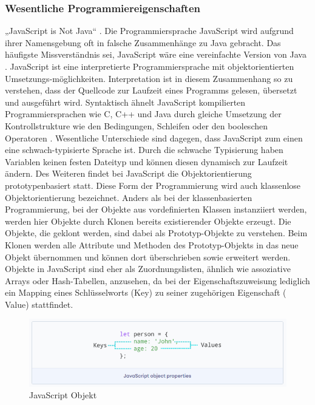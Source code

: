 \subsubsection{Wesentliche Programmiereigenschaften}
„JavaScript is Not Java“  \cite{JS1.091}. Die Programmiersprache JavaScript wird aufgrund ihrer Namensgebung oft in falsche Zusammenhänge zu Java gebracht. Das häufigste Missverständnis sei, JavaScript wäre eine vereinfachte Version von Java \cite{JS1.091}.
\newline
\noindent
JavaScript ist eine interpretierte Programmiersprache mit objektorientierten Umsetzungs-möglichkeiten. Interpretation ist in diesem Zusammenhang so zu verstehen, dass der Quellcode zur Laufzeit eines Programms gelesen, übersetzt und ausgeführt wird.
Syntaktisch ähnelt JavaScript kompilierten Programmiersprachen wie C, C++ und Java durch gleiche Umsetzung der Kontrollstrukture wie den Bedingungen, Schleifen oder den booleschen Operatoren \cite{JS1.1}. Wesentliche Unterschiede sind dagegen, dass JavaScript zum einen eine schwach-typisierte Sprache ist. Durch die schwache Typisierung haben Variablen keinen festen Dateityp und können diesen dynamisch zur Laufzeit ändern. Des Weiteren findet bei JavaScript die Objektorientierung prototypenbasiert statt. Diese Form der Programmierung wird auch klassenlose Objektorientierung bezeichnet. Anders als bei der klassenbasierten Programmierung, bei der Objekte aus vor\-de\-fi\-niert\-en Klassen instanziiert werden, werden hier Objekte durch Klonen bereits existierender Objekte erzeugt. Die Objekte, die geklont werden, sind dabei als Prototyp-Objekte zu ver\-steh\-en. Beim Klonen werden alle Attribute und Methoden des Prototyp-Objekts in das neue Objekt übernommen und können dort überschrieben sowie erweitert werden. Objekte in JavaScript sind eher als Zuordnungslisten, ähnlich wie assoziative Arrays oder Hash-Tabellen, anzusehen, da bei der Eigenschaftszuweisung lediglich ein Mapping eines Schlüsselworts (Key) zu seiner zugehörigen Eigenschaft ( Value) stattfindet.
\newline

\begin{figure}[tbt]
\centering
\includegraphics[width=\textwidth]{images/JavaScript_Object.PNG}
\caption[JavaScript Objekt]{JavaScript Objekt \cite{JS1.29}}
\end{figure}



